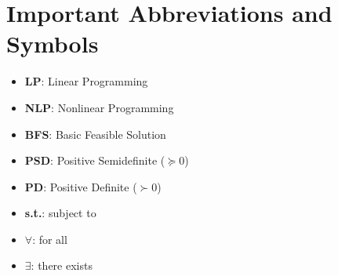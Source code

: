 \documentclass[10pt,a4paper,landscape]{article}
\begin{document}
\section*{Important Abbreviations and Symbols}
\begin{itemize}
\item \textbf{LP}: Linear Programming
\item \textbf{NLP}: Nonlinear Programming  
\item \textbf{BFS}: Basic Feasible Solution
\item \textbf{PSD}: Positive Semidefinite ($\succeq 0$)
\item \textbf{PD}: Positive Definite ($\succ 0$)
\item \textbf{s.t.}: subject to
\item \textbf{$\forall$}: for all
\item \textbf{$\exists$}: there exists
\end{itemize}
\end{document}
